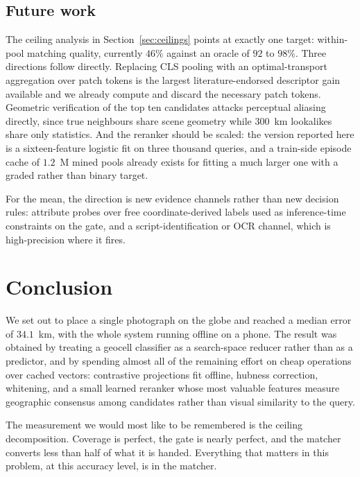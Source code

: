\documentclass[11pt,a4paper]{article}
\begin{document}
\subsection{Future work}

The ceiling analysis in Section~\ref{sec:ceilings} points at exactly one target: within-pool
matching quality, currently $46\%$ against an oracle of $92$ to $98\%$. Three directions
follow directly. Replacing CLS pooling with an optimal-transport aggregation over patch tokens
\cite{izquierdo2024salad} is the largest literature-endorsed descriptor gain available and we
already compute and discard the necessary patch tokens. Geometric verification of the top ten
candidates \cite{hausler2021patchnetvlad} attacks perceptual aliasing directly, since true
neighbours share scene geometry while 300~km lookalikes share only statistics. And the
reranker should be scaled: the version reported here is a sixteen-feature logistic fit on
three thousand queries, and a train-side episode cache of $1.2$~M mined pools already exists
for fitting a much larger one with a graded rather than binary target.

For the mean, the direction is new evidence channels rather than new decision rules:
attribute probes over free coordinate-derived labels used as inference-time constraints on the
gate, and a script-identification or OCR channel, which is high-precision where it fires.

\section{Conclusion}

We set out to place a single photograph on the globe and reached a median error of $34.1$~km,
with the whole system running offline on a phone. The result was obtained by treating a
geocell classifier as a search-space reducer rather than as a predictor, and by spending
almost all of the remaining effort on cheap operations over cached vectors: contrastive
projections fit offline, hubness correction, whitening, and a small learned reranker whose
most valuable features measure geographic consensus among candidates rather than visual
similarity to the query.

The measurement we would most like to be remembered is the ceiling decomposition. Coverage is
perfect, the gate is nearly perfect, and the matcher converts less than half of what it is
handed. Everything that matters in this problem, at this accuracy level, is in the matcher.
\end{document}
